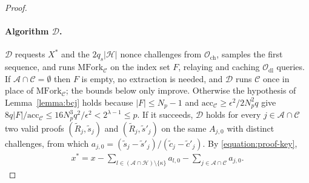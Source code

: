 \documentclass{article}
\theoremstyle{plain}
\theoremstyle{definition}
\theoremstyle{remark}
\begin{document}
\begin{proof}
  \paragraph{Algorithm $\mathcal{D}$.}  $\mathcal{D}$ requests $X^*$ and the $2 q_s |\mathcal{H}|$ nonce challenges from $\mathcal{O}_{\mathrm{ch}}$, samples the first sequence, and runs $\mathrm{MFork}_{\mathcal{C}}$ on the index set $F$, relaying and caching $\mathcal{O}_{\mathrm{dl}}$ queries.  If $\mathcal{A} \cap \mathcal{C} = \emptyset$ then $F$ is empty, no extraction is needed, and $\mathcal{D}$ runs $\mathcal{C}$ once in place of $\mathrm{MFork}_{\mathcal{C}}$; the bounds below only improve.  Otherwise the hypothesis of Lemma~\ref{lemma:bcj} holds because $|F| \le N_p - 1$ and $\mathrm{acc}_{\mathcal{C}} \ge \epsilon^2 / 2 N_p^2 q$ give $8q|F| / \mathrm{acc}_{\mathcal{C}} \le 16 N_p^3 q^2 / \epsilon^2 < 2^{\lambda - 1} \le p$.  If it succeeds, $\mathcal{D}$ holds for every $j \in \mathcal{A} \cap \mathcal{C}$ two valid proofs $(\tilde{R}_j, \tilde{s}_j)$ and $(\tilde{R}_j, \tilde{s}'_j)$ on the same $A_{j,0}$ with distinct challenges, from which $a_{j,0} = (\tilde{s}_j - \tilde{s}'_j) / (\tilde{c}_j - \tilde{c}'_j)$.  By \eqref{equation:proof-key},
  \begin{align}\label{equation:proof-xstar}
    x^* = x - \sum_{l \in (\mathcal{A} \cap \mathcal{H}) \setminus \{\kappa\}} a_{l,0} - \sum_{j \in \mathcal{A} \cap \mathcal{C}} a_{j,0}.
  \end{align}


\end{proof}
\end{document}

